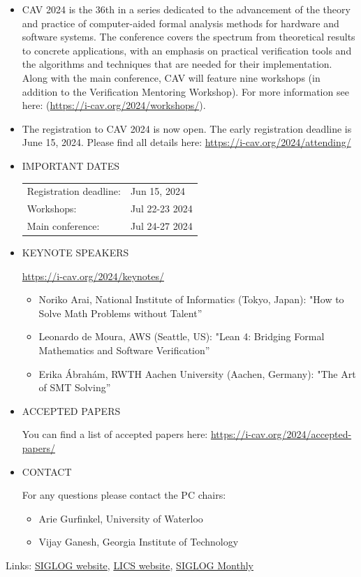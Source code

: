 \documentclass[prodmode,acmtecs]{acmsmall} %
\begin{document}
\begin{itemize}\item  CAV 2024 is the 36th in a series dedicated to the advancement of the theory and practice of computer-aided formal analysis methods for hardware and software systems. The conference covers the spectrum from theoretical results to concrete applications, with an emphasis on practical verification tools and the algorithms and techniques that are needed for their implementation. Along with the main conference, CAV will feature nine workshops (in addition to the Verification Mentoring Workshop). For more information see here: (\href{https://i-cav.org/2024/workshops/}{https://i-cav.org/2024/workshops/}).  
 
\item  The registration to CAV 2024 is now open. The early registration deadline is June 15, 2024. Please find all details here: \href{https://i-cav.org/2024/attending/}{https://i-cav.org/2024/attending/}  
 
\item  IMPORTANT DATES 
 
\begin{tabulary}{\linewidth}{LL}Registration deadline:  & Jun 15, 2024 \\
Workshops:  & Jul 22-23 2024 \\
Main conference:  & Jul 24-27 2024 \\
\end{tabulary}
 
\item  KEYNOTE SPEAKERS   
 
  \href{https://i-cav.org/2024/keynotes/}{https://i-cav.org/2024/keynotes/}  
 
\begin{itemize}\item  Noriko Arai, National Institute of Informatics (Tokyo, Japan): "How to Solve Math Problems without Talent”
\item  Leonardo de Moura, AWS (Seattle, US): "Lean 4: Bridging Formal Mathematics and Software Verification”
\item  Erika Ábrahám, RWTH Aachen University (Aachen, Germany): "The Art of SMT Solving”
\end{itemize} 
\item  ACCEPTED PAPERS   
 
  You can find a list of accepted papers here: \href{https://i-cav.org/2024/accepted-papers/}{https://i-cav.org/2024/accepted-papers/}  
 
\item  CONTACT  
 
  For any questions please contact the PC chairs:  
 
\begin{itemize}\item  Arie Gurfinkel, University of Waterloo
\item  Vijay Ganesh, Georgia Institute of Technology 
\end{itemize} 
\end{itemize}


\bigskip Links: \href{http://siglog.org/}{SIGLOG website}, \href{https://lics.siglog.org}{LICS website}, \href{https://lics.siglog.org/newsletters/}{SIGLOG Monthly}
\end{document}
